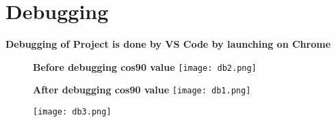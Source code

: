\documentclass{article}
\author{Naziya Bano}
\date{October 2023}
\begin{document}
\section{\huge Debugging}
\Large
\textbf{Debugging of Project is done by VS Code by launching on Chrome }
    \begin{figure}[h]
    \centering
    \textbf{\Large Before debugging cos90 value}
    \texttt{[image: db2.png]}
\end{figure}
 \begin{figure}[h]
    \centering
     \textbf{\Large After debugging cos90 value}
    \texttt{[image: db1.png]}
\end{figure} 

\begin{figure}[h]
    \centering  
    \texttt{[image: db3.png]}
\end{figure}
\end{document}
